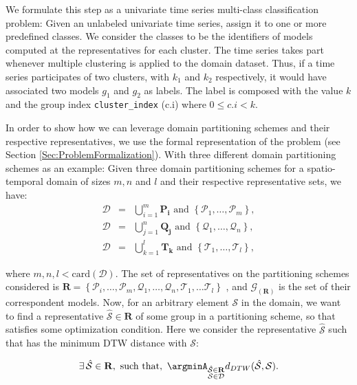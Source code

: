 We formulate this step as a univariate time series multi-class classification problem: Given an unlabeled univariate time series, assign it to one or more predefined classes. We consider the classes to be the identifiers of models computed at the representatives for each cluster. The time series takes part whenever multiple clustering is applied to the domain dataset. Thus, if a time series participates of two clusters, with $k_1$ and $k_2$ respectively, it would have associated two models $g_1$ and $g_2$ as labels. The label is composed with the value $k$ and the group index \texttt{cluster\_index} (c.i) where $0 \leq c.i <k$.

In order to show how we can leverage domain partitioning schemes and their respective representatives, we use the formal representation of the problem (see Section \ref{Sec:ProblemFormalization}). With three different domain partitioning schemes as an example: Given three domain partitioning schemes for a spatio-temporal domain of sizes $m, n$ and $l$ and their respective representative sets, we have:
\begin{eqnarray} 
\nonumber
\mathcal{D}	& = & \bigcup_{i=1}^{m} \mathbf{P_i} \,\,\textrm{and} \,\, \left\{\mathcal{P}_{1}, \ldots, \mathcal{P}_{m}\right\}, \\ \nonumber
\mathcal{D} & = & \bigcup_{j=1}^{n} \mathbf{Q_j} \,\,\textrm{and} \,\, \left\{\mathcal{Q}_{1}, \ldots, \mathcal{Q}_{n}\right\}, \\ \nonumber 
\mathcal{D} & = & \bigcup_{k=1}^{l} \mathbf{T_k} \,\,\textrm{and} \,\, \left\{\mathcal{T}_{1}, \ldots, \mathcal{T}_{l}\right\},
\end{eqnarray}

where $m, n, l < \textrm{card}(\mathcal{D})$. The set of representatives on the partitioning schemes considered is $\mathbf{R} = \left\{\mathcal{P}_{i}, \ldots, \mathcal{P}_{m}, \mathcal{Q}_{1}, \ldots, \mathcal{Q}_{n}, \mathcal{T}_{1}, \ldots \mathcal{T}_{l} \right\}$ , and $\mathcal{G}_{(\mathbf{R})}$ is the set of their correspondent models. Now, for an arbitrary element $\mathcal{S}$ in the domain, we want to find a representative $\mathcal{\hat{S}} \in \mathbf{R}$ of some group in a partitioning scheme, so that satisfies some optimization condition. Here we consider the representative $\mathcal{\hat{S}}$ such that has the minimum DTW distance with $\mathcal{S}$:

\begin{equation}\label{eq:timeseries-representative}
 \exists\, \mathcal{\hat{S}} \in \mathbf{R}, \,\, \textrm{such that}, \,\, \argminA_{\substack{\mathcal{\hat{S}} \in \mathbf{R}\\\mathcal{S} \in \mathcal{D}}} d_{DTW}(\mathcal{\hat{S}}, \mathcal{S}).
\end{equation}

